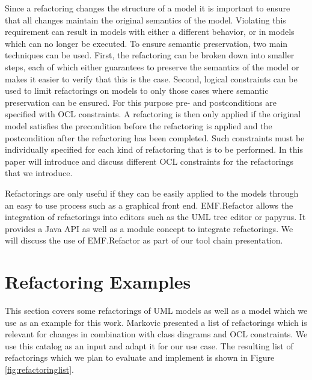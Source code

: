 \documentclass{llncs}
\begin{document}
Since a refactoring changes the structure of a model it is important to ensure that all changes maintain the original 
semantics of the model. Violating this requirement can result in models with either a different behavior, or in models 
which can no longer be executed. To ensure semantic preservation, two main techniques can be used. First, the refactoring 
can be broken down into smaller steps, each of which either guarantees to preserve the semantics of the model or makes it 
easier to verify that this is the case. Second, logical constraints can be used to limit refactorings on models to only 
those cases where semantic preservation can be ensured. For this purpose pre- and postconditions are specified with OCL 
constraints. A refactoring is then only applied if the original model satisfies the precondition before the refactoring is 
applied and the postcondition after the refactoring has been completed. Such constraints must be individually specified 
for each kind of refactoring that is to be performed. In this paper will introduce and discuss different OCL constraints 
for  the refactorings that we introduce.

Refactorings are only useful if they can be easily applied to the models through an easy to use process such as a 
graphical front end. EMF.Refactor allows the integration of refactorings into editors such as the UML tree editor or 
papyrus. It provides a Java API as well as a module concept to integrate refactorings. We will discuss the use of 
EMF.Refactor as part of our tool chain presentation.


\section{Refactoring Examples}
\label{refactoring-examples}

This section covers some refactorings of UML models as well as a model which we use as an example for this work. 
Markovic \cite{MarkovicB08} presented a list of refactorings which is relevant for changes in combination with class 
diagrams and OCL constraints. We use this catalog as an input and adapt it for our use case. The resulting list of 
refactorings which we plan to evaluate and implement is shown in Figure \ref{fig:refactoringlist}.
\end{document}

